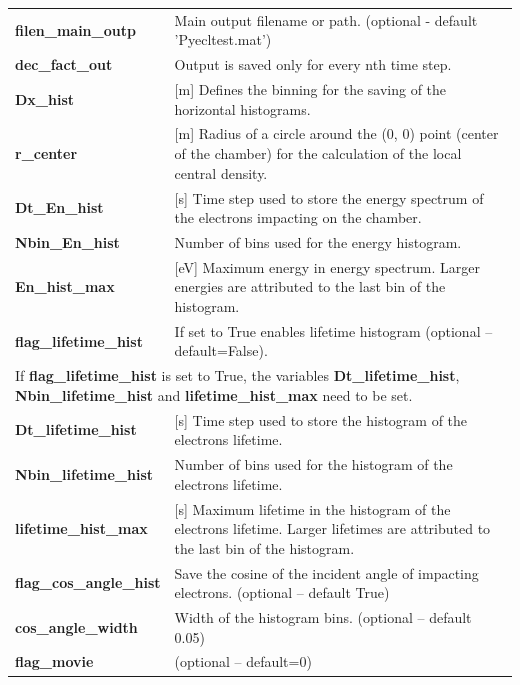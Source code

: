 \documentclass[a4paper,12pt]{article}
\begin{document}
\begin{longtable}{p{}p{}}
\hline\endfirsthead\hline\endhead\rowcolor{Gray}
\multicolumn{2}{p{.97\textwidth}}{
\textbf{Saving settings}
}\\ \hline
    \textbf{filen\_main\_outp} & Main output filename or path. (optional - default 'Pyecltest.mat') \\ \hline
    \textbf{dec\_fact\_out} & Output is saved only for every nth time step. \\ \hline
\textbf{Dx\_hist}& 	[m] Defines the binning for the saving of the horizontal histograms.\\ \hline
\textbf{r\_center}&	[m] Radius of a circle around the (0, 0) point (center of the chamber) for the calculation of the local central density.\\ \hline
\textbf{Dt\_En\_hist}&	[s] Time step used to store the energy spectrum  of the electrons impacting on the chamber.\\ \hline
\textbf{Nbin\_En\_hist}&	Number of bins used for the energy histogram.\\ \hline
\textbf{En\_hist\_max}& 	[eV] Maximum energy in energy spectrum. Larger energies are attributed to the last bin of the histogram.	\\ \hline
\textbf{flag\_lifetime\_hist}&   If set to True enables lifetime histogram (optional -- default=False).\\ \hline
\multicolumn{2}{p{.97\textwidth}}{If \textbf{flag\_lifetime\_hist} is set to True, the variables \textbf{Dt\_lifetime\_hist}, \textbf{Nbin\_lifetime\_hist} and \textbf{lifetime\_hist\_max} need to be set.}\\ \hline
\textbf{Dt\_lifetime\_hist}&	[s] Time step used to store the histogram of the electrons lifetime.\\ \hline
\textbf{Nbin\_lifetime\_hist}&	Number of bins used for the histogram of the electrons lifetime.\\ \hline
\textbf{lifetime\_hist\_max}& 	[s] Maximum lifetime in the histogram of the electrons lifetime. Larger lifetimes are attributed to the last bin of the histogram.	\\ \hline
\textbf{flag\_cos\_angle\_hist} & Save the cosine of the incident angle of impacting electrons. (optional -- default True) \\ \hline
\textbf{cos\_angle\_width} & Width of the histogram bins. (optional -- default 0.05) \\ \hline
\textbf{flag\_movie}&	(optional -- default=0)


\end{longtable}
\end{document}
